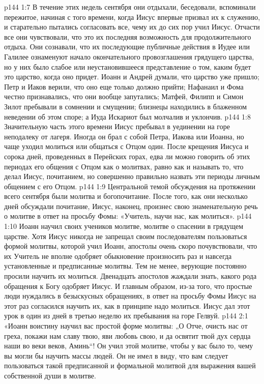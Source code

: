 \vs p144 1:7 В течение этих недель сентября они отдыхали, беседовали, вспоминали пережитое, начиная с того времени, когда Иисус впервые призвал их к служению, и старательно пытались согласовать все, чему их до сих пор учил Иисус. Отчасти все они чувствовали, что это их последняя возможность для продолжительного отдыха. Они сознавали, что их последующие публичные действия в Иудее или Галилее ознаменуют начало окончательного провозглашения грядущего царства, но у них было слабое или неустановившееся представление о том, каким будет это царство, когда оно придет. Иоанн и Андрей думали, что царство уже пришло; Петр и Иаков верили, что оно еще только должно прийти; Нафанаил и Фома честно признавались, что они вообще запутались; Матфей, Филипп и Симон Зилот пребывали в сомнении и смущении; близнецы находились в блаженном неведении об этом споре; а Иуда Искариот был молчалив и уклончив.
\vs p144 1:8 Значительную часть этого времени Иисус пребывал в уединении на горе неподалеку от лагеря. Иногда он брал с собой Петра, Иакова или Иоанна, но чаще уходил молиться или общаться с Отцом один. После крещения Иисуса и сорока дней, проведенных в Перейских горах, едва ли можно говорить об этих периодах его общения с Отцом как о молитвах, равно как и называть то, что делал Иисус, почитанием, но совершенно правильно назвать эти периоды личным общением с его Отцом.
\vs p144 1:9 Центральной темой обсуждения на протяжении всего сентября были молитва и богопочитание. После того, как они несколько дней обсуждали почитание, Иисус, наконец, произнес свою знаменательную речь о молитве в ответ на просьбу Фомы: «Учитель, научи нас, как молиться».
\vs p144 1:10 Иоанн научил своих учеников молитве, молитве о спасении в грядущем царстве. Хотя Иисус никогда не запрещал своим последователям пользоваться формой молитвы, которой учил Иоанн, апостолы очень скоро почувствовали, что их Учитель не вполне одобряет обыкновение произносить раз и навсегда установленные и предписанные молитвы. Тем не менее, верующие постоянно просили научить их молиться. Двенадцать апостолов жаждали знать, какого рода обращения к Богу одобряет Иисус. И главным образом, из\hyp{}за того, что простые люди нуждались в безыскусных обращениях, в ответ на просьбу Фомы Иисус на этот раз согласился научить их, как в принципе надо молиться. Иисус дал этот урок в один из дней в третью неделю их пребывания на горе Гелвуй.
\vs p144 2:1 «Иоанн воистину научил вас простой форме молитвы: „О Отче, очисть нас от греха, покажи нам славу твою, яви любовь свою, и да освятит твой дух сердца наши во веки веков, Аминь“! Он учил этой молитве, чтобы у вас было то, чему вы могли бы научить массы людей. Он не имел в виду, что вам следует пользоваться такой предписанной и формальной молитвой для выражения вашей собственной души в молитве.
